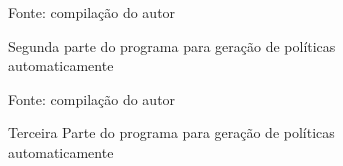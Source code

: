 \begin{figure}[!h]
	\centering
	\caption{Segunda parte do programa para geração de políticas automaticamente}
	
	\label{fig:geracao-politicas-parte2}
	{\scriptsize Fonte: compilação do autor}
\end{figure}

\begin{figure}[!h]
	\centering
	\caption{Terceira Parte do programa para geração de políticas automaticamente}
	
	\label{fig:geracao-politicas-part3}
	{\scriptsize Fonte: compilação do autor}
\end{figure} 

